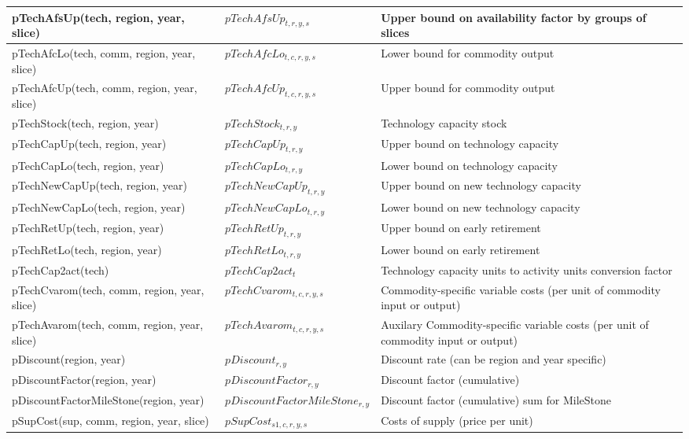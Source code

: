 \documentclass{article}
\begin{document}
\begin{longtable}{|p{10cm}|p{5cm}|p{9cm}|}
 \hline
pTechAfsUp(tech, region, year, slice) & $pTechAfsUp_{t,r,y,s}$ & Upper bound on availability factor by groups of slices \\ 
 \hline
pTechAfcLo(tech, comm, region, year, slice) & $pTechAfcLo_{t,c,r,y,s}$ & Lower bound for commodity output \\ 
 \hline
pTechAfcUp(tech, comm, region, year, slice) & $pTechAfcUp_{t,c,r,y,s}$ & Upper bound for commodity output \\ 
 \hline
pTechStock(tech, region, year) & $pTechStock_{t,r,y}$ & Technology capacity stock \\ 
 \hline
pTechCapUp(tech, region, year) & $pTechCapUp_{t,r,y}$ & Upper bound on technology capacity \\ 
 \hline
pTechCapLo(tech, region, year) & $pTechCapLo_{t,r,y}$ & Lower bound on technology capacity \\ 
 \hline
pTechNewCapUp(tech, region, year) & $pTechNewCapUp_{t,r,y}$ & Upper bound on new technology capacity \\ 
 \hline
pTechNewCapLo(tech, region, year) & $pTechNewCapLo_{t,r,y}$ & Lower bound on new technology capacity \\ 
 \hline
pTechRetUp(tech, region, year) & $pTechRetUp_{t,r,y}$ & Upper bound on early retirement \\ 
 \hline
pTechRetLo(tech, region, year) & $pTechRetLo_{t,r,y}$ & Lower bound on early retirement \\ 
 \hline
pTechCap2act(tech) & $pTechCap2act_{t}$ & Technology capacity units to activity units conversion factor \\ 
 \hline
pTechCvarom(tech, comm, region, year, slice) & $pTechCvarom_{t,c,r,y,s}$ & Commodity-specific variable costs (per unit of commodity input or output) \\ 
 \hline
pTechAvarom(tech, comm, region, year, slice) & $pTechAvarom_{t,c,r,y,s}$ & Auxilary Commodity-specific variable costs (per unit of commodity input or output) \\ 
 \hline
pDiscount(region, year) & $pDiscount_{r,y}$ & Discount rate (can be region and year specific) \\ 
 \hline
pDiscountFactor(region, year) & $pDiscountFactor_{r,y}$ & Discount factor (cumulative) \\ 
 \hline
pDiscountFactorMileStone(region, year) & $pDiscountFactorMileStone_{r,y}$ & Discount factor (cumulative) sum for MileStone \\ 
 \hline
pSupCost(sup, comm, region, year, slice) & $pSupCost_{s1,c,r,y,s}$ & Costs of supply (price per unit) \\ 

\end{longtable}
\end{document}
